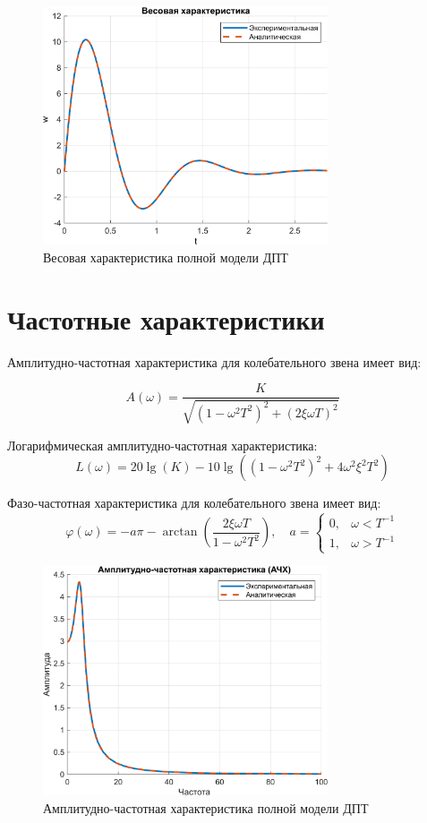 \begin{figure}[H]
    \centering
    \includegraphics[width=0.75\textwidth, trim={0cm 0cm 0cm 0cm}]{../images/2_2.png}
    \caption{Весовая характеристика полной модели ДПТ}
\end{figure}

\section{Частотные характеристики}

Амплитудно-частотная характеристика для колебательного звена имеет вид:

\[
    A(\omega) = \frac{K}{\sqrt{(1 - \omega^2 T^2)^2 + (2 \xi \omega T)^2}}
\]

Логарифмическая амплитудно-частотная характеристика:
\[
    L(\omega) = 20 \lg(K) - 10 \lg\left((1 - \omega^2 T^2)^2 + 4 \omega^2 \xi^2 T^2\right)
\]

Фазо-частотная характеристика для колебательного звена имеет вид:
\[
    \varphi(\omega) = -a\pi - \arctan\left(\frac{2 \xi \omega T}{1 - \omega^2 T^2}\right), \quad 
    a = 
    \begin{cases} 
    0, & \omega < T^{-1} \\ 
    1, & \omega > T^{-1} 
    \end{cases}
\]

\begin{figure}[H]
    \centering
    \includegraphics[width=0.75\textwidth, trim={0cm 0cm 0cm 0cm}]{../images/2_3.png}
    \caption{Амплитудно-частотная характеристика полной модели ДПТ}
\end{figure}

